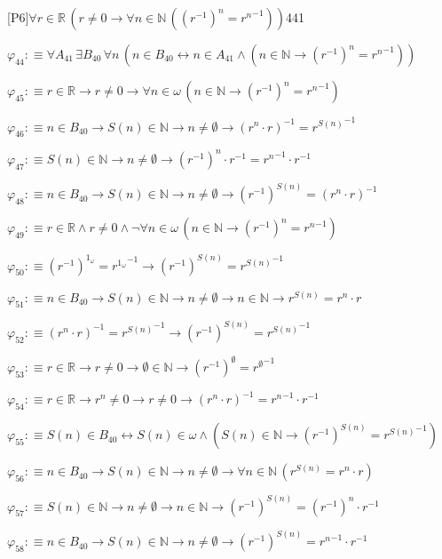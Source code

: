 \begin{fullproof}{[P6]}{$\forall r \in \mathbb{R}\,(r \neq 0 \to \forall n \in \mathbb{N}\,({{(r^{-1})}^{n}} = {{r}^{n}}^{-1}))$}{441}
\begin{abbrevlist}
\item $\varphi_{44} :\equiv \forall A_{41}\,\exists B_{40}\,\forall n\,(n \in B_{40} \leftrightarrow n \in A_{41} \land (n \in \mathbb{N} \to {{(r^{-1})}^{n}} = {{r}^{n}}^{-1}))$
\item $\varphi_{45} :\equiv r \in \mathbb{R} \to r \neq 0 \to \forall n \in \omega\,(n \in \mathbb{N} \to {{(r^{-1})}^{n}} = {{r}^{n}}^{-1})$
\item $\varphi_{46} :\equiv n \in B_{40} \to S(n) \in \mathbb{N} \to n \neq \emptyset \to ({{r}^{n}} \cdot r)^{-1} = {{r}^{S(n)}}^{-1}$
\item $\varphi_{47} :\equiv S(n) \in \mathbb{N} \to n \neq \emptyset \to {{(r^{-1})}^{n}} \cdot r^{-1} = {{r}^{n}}^{-1} \cdot r^{-1}$
\item $\varphi_{48} :\equiv n \in B_{40} \to S(n) \in \mathbb{N} \to n \neq \emptyset \to {{(r^{-1})}^{S(n)}} = ({{r}^{n}} \cdot r)^{-1}$
\item $\varphi_{49} :\equiv r \in \mathbb{R} \land r \neq 0 \land \neg \forall n \in \omega\,(n \in \mathbb{N} \to {{(r^{-1})}^{n}} = {{r}^{n}}^{-1})$
\item $\varphi_{50} :\equiv {{(r^{-1})}^{1_{\omega}}} = {{r}^{1_{\omega}}}^{-1} \to {{(r^{-1})}^{S(n)}} = {{r}^{S(n)}}^{-1}$
\item $\varphi_{51} :\equiv n \in B_{40} \to S(n) \in \mathbb{N} \to n \neq \emptyset \to n \in \mathbb{N} \to {{r}^{S(n)}} = {{r}^{n}} \cdot r$
\item $\varphi_{52} :\equiv ({{r}^{n}} \cdot r)^{-1} = {{r}^{S(n)}}^{-1} \to {{(r^{-1})}^{S(n)}} = {{r}^{S(n)}}^{-1}$
\item $\varphi_{53} :\equiv r \in \mathbb{R} \to r \neq 0 \to \emptyset \in \mathbb{N} \to {{(r^{-1})}^{\emptyset}} = {{r}^{\emptyset}}^{-1}$
\item $\varphi_{54} :\equiv r \in \mathbb{R} \to {{r}^{n}} \neq 0 \to r \neq 0 \to ({{r}^{n}} \cdot r)^{-1} = {{r}^{n}}^{-1} \cdot r^{-1}$
\item $\varphi_{55} :\equiv S(n) \in B_{40} \leftrightarrow S(n) \in \omega \land (S(n) \in \mathbb{N} \to {{(r^{-1})}^{S(n)}} = {{r}^{S(n)}}^{-1})$
\item $\varphi_{56} :\equiv n \in B_{40} \to S(n) \in \mathbb{N} \to n \neq \emptyset \to \forall n \in \mathbb{N}\,({{r}^{S(n)}} = {{r}^{n}} \cdot r)$
\item $\varphi_{57} :\equiv S(n) \in \mathbb{N} \to n \neq \emptyset \to n \in \mathbb{N} \to {{(r^{-1})}^{S(n)}} = {{(r^{-1})}^{n}} \cdot r^{-1}$
\item $\varphi_{58} :\equiv n \in B_{40} \to S(n) \in \mathbb{N} \to n \neq \emptyset \to {{(r^{-1})}^{S(n)}} = {{r}^{n}}^{-1} \cdot r^{-1}$

\end{abbrevlist}
\end{fullproof}
